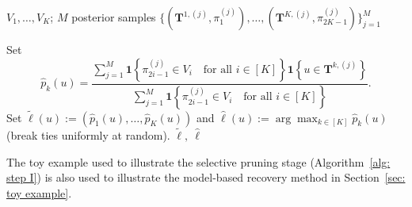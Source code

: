 \documentclass[twoside,11pt]{article}
\theoremstyle{remark}
\begin{document}
\begin{algorithm}[tbp]

\caption{Model Recovery}
\label{alg: Model recovery}
 $V_1,\ldots,V_K$; $M$ posterior samples $\{( \bm{T}^{1, (j)}, \pi_1^{(j)}), \ldots, (\bm{T}^{K, (j)}, \pi_{2K-1}^{(j)})\}_{j=1}^M$

{
Set
%
\begin{equation*}
\hat{p}_k(u) = \frac{\sum_{j=1}^M \mathbf{1}\left\{\pi^{(j)}_{2i-1} \in V_i \quad \text{for all $i\in \left[K\right]$}\right\} \mathbf{1}\left\{u \in \bm{T}^{k, (j)}\right\}}{\sum_{j=1}^M \mathbf{1}\left\{\pi^{(j)}_{2i-1} \in V_i \quad \text{for all $i\in \left[K\right]$}\right\}}.
\end{equation*}
%
Set $\tilde{\ell}(u):=(\hat p_1(u),\ldots,\hat p_K(u))$ and $\hat{\ell}(u):= \arg\max_{k\in[K]} \hat p_k(u)$
(break ties uniformly at random).
} 
\Return $\tilde{\ell},\ \hat{\ell}$\;

\end{algorithm}

The toy example used to illustrate the selective pruning stage (Algorithm~\ref{alg: step I}) is also used to illustrate the model-based recovery method in Section~\ref{sec: toy example}.
\end{document}
